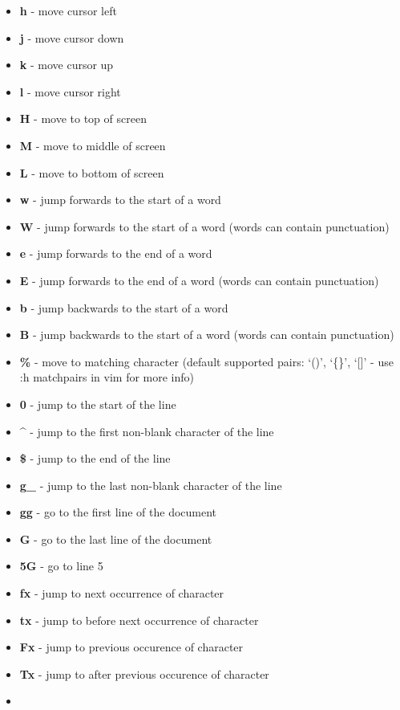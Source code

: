 \documentclass[landscape,twocolumn]{article}
\providecommand{\tightlist}{%
  \setlength{\itemsep}{0pt}\setlength{\parskip}{0pt}}
\begin{document}
\begin{itemize}
\tightlist
\item
  \textbf{h} - move cursor left
\item
  \textbf{j} - move cursor down
\item
  \textbf{k} - move cursor up
\item
  \textbf{l} - move cursor right
\item
  \textbf{H} - move to top of screen
\item
  \textbf{M} - move to middle of screen
\item
  \textbf{L} - move to bottom of screen
\item
  \textbf{w} - jump forwards to the start of a word
\item
  \textbf{W} - jump forwards to the start of a word (words can contain
  punctuation)
\item
  \textbf{e} - jump forwards to the end of a word
\item
  \textbf{E} - jump forwards to the end of a word (words can contain
  punctuation)
\item
  \textbf{b} - jump backwards to the start of a word
\item
  \textbf{B} - jump backwards to the start of a word (words can contain
  punctuation)
\item
  \textbf{\%} - move to matching character (default supported pairs:
  `()', `\{\}', `{[}{]}' - use :h matchpairs in vim for more info)
\item
  \textbf{0} - jump to the start of the line
\item
  \textbf{\^{}} - jump to the first non-blank character of the line
\item
  \textbf{\$} - jump to the end of the line
\item
  \textbf{g\_} - jump to the last non-blank character of the line
\item
  \textbf{gg} - go to the first line of the document
\item
  \textbf{G} - go to the last line of the document
\item
  \textbf{5G} - go to line 5
\item
  \textbf{fx} - jump to next occurrence of character
\item
  \textbf{tx} - jump to before next occurrence of character
\item
  \textbf{Fx} - jump to previous occurence of character
\item
  \textbf{Tx} - jump to after previous occurence of character
\item

\end{itemize}
\end{document}
